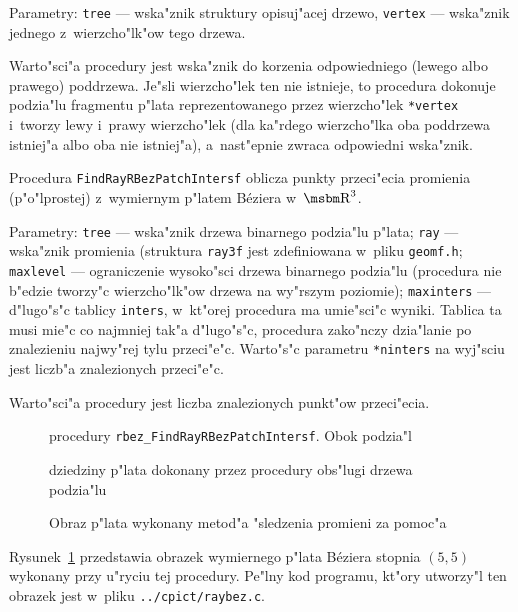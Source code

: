 Parametry: \texttt{tree} --- wska"znik struktury opisuj"acej drzewo,
\texttt{vertex} --- wska"znik jednego z~wierzcho"lk"ow tego drzewa.

Warto"sci"a procedury jest wska"znik do korzenia odpowiedniego (lewego albo
prawego) poddrzewa. Je"sli wierzcho"lek ten nie istnieje, to procedura
dokonuje podzia"lu fragmentu p"lata reprezentowanego przez wierzcho"lek
\texttt{*vertex} i~tworzy lewy i~prawy wierzcho"lek (dla ka"rdego
wierzcho"lka oba poddrzewa istniej"a albo oba nie istniej"a), a~nast"epnie
zwraca odpowiedni wska"znik.

\vspace{\bigskipamount}
\begin{sloppypar}
Procedura \texttt{FindRayRBezPatchIntersf} oblicza punkty przeci"ecia
promienia (p"o"lprostej) z~wymiernym p"latem B\'{e}ziera w~$\R^3$.
\end{sloppypar}

Parametry: \texttt{tree} --- wska"znik drzewa binarnego podzia"lu p"lata;
\texttt{ray} --- wska"znik promienia (struktura \texttt{ray3f} jest
zdefiniowana w~pliku \texttt{geomf.h}; \texttt{maxlevel} --- ograniczenie
wysoko"sci drzewa binarnego podzia"lu (procedura nie b"edzie tworzy"c
wierzcho"lk"ow drzewa na wy"rszym poziomie); \texttt{maxinters} ---
d"lugo"s"c tablicy \texttt{inters}, w~kt"orej procedura ma umie"sci"c
wyniki. Tablica ta musi mie"c co najmniej tak"a d"lugo"s"c, procedura
zako"nczy dzia"lanie po znalezieniu najwy"rej tylu przeci"e"c. Warto"s"c
parametru \texttt{*ninters} na wyj"sciu jest liczb"a znalezionych
przeci"e"c.

Warto"sci"a procedury jest liczba znalezionych punkt"ow przeci"ecia.

\begin{figure}[ht]
  \centerline{}
  \caption{\label{fig:raybezp}Obraz p"lata wykonany metod"a "sledzenia
    promieni za pomoc"a}
  \centerline{procedury \texttt{rbez\_FindRayRBezPatchIntersf}. Obok podzia"l}
  \centerline{dziedziny p"lata dokonany przez procedury obs"lugi drzewa
    podzia"lu}
\end{figure}
Rysunek~\ref{fig:raybezp} przedstawia obrazek wymiernego p"lata B\'{e}ziera
stopnia $(5,5)$ wykonany przy u"ryciu tej procedury. Pe"lny kod programu,
kt"ory utworzy"l ten obrazek jest w~pliku \texttt{../cpict/raybez.c}.


